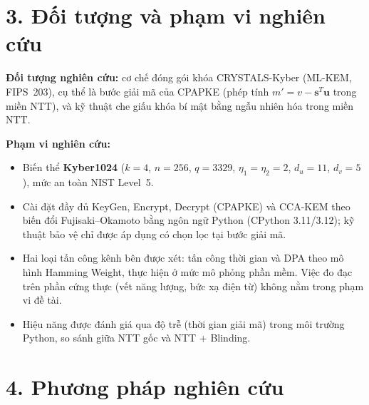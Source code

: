 \documentclass[../LuanVan.tex]{subfiles}
\begin{document}
\section*{3. Đối tượng và phạm vi nghiên cứu}

\textbf{Đối tượng nghiên cứu:} cơ chế đóng gói khóa CRYSTALS-Kyber (ML-KEM, FIPS~203), cụ thể là bước giải mã của CPAPKE (phép tính $m' = v - \mathbf{s}^{T}\mathbf{u}$ trong miền NTT), và kỹ thuật che giấu khóa bí mật bằng ngẫu nhiên hóa trong miền NTT.

\textbf{Phạm vi nghiên cứu:}
\begin{itemize}
    \item Biến thể \textbf{Kyber1024} ($k=4$, $n=256$, $q=3329$, $\eta_1=\eta_2=2$, $d_u=11$, $d_v=5$), mức an toàn NIST Level~5.
    \item Cài đặt đầy đủ KeyGen, Encrypt, Decrypt (CPAPKE) và CCA-KEM theo biến đổi Fujisaki--Okamoto bằng ngôn ngữ Python (CPython 3.11/3.12); kỹ thuật bảo vệ chỉ được áp dụng có chọn lọc tại bước giải mã.
    \item Hai loại tấn công kênh bên được xét: tấn công thời gian và DPA theo mô hình Hamming Weight, thực hiện ở mức mô phỏng phần mềm. Việc đo đạc trên phần cứng thực (vết năng lượng, bức xạ điện từ) không nằm trong phạm vi đề tài.
    \item Hiệu năng được đánh giá qua độ trễ (thời gian giải mã) trong môi trường Python, so sánh giữa NTT gốc và NTT + Blinding.
\end{itemize}

\section*{4. Phương pháp nghiên cứu}
\end{document}
